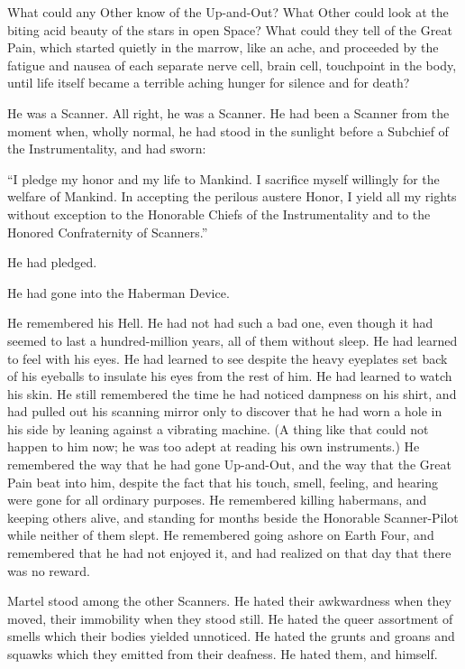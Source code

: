 What could any Other know of the Up-and-Out? What Other could look at the biting acid beauty of the stars in open Space? What could they tell of the Great Pain, which started quietly in the marrow, like an ache, and proceeded by the fatigue and nausea of each separate nerve cell, brain cell, touchpoint in the body, until life itself became a terrible aching hunger for silence and for death?

He was a Scanner. All right, he was a Scanner. He had been a Scanner from the moment when, wholly normal, he had stood in the sunlight before a Subchief of the Instrumentality, and had sworn:

``I pledge my honor and my life to Mankind. I sacrifice myself willingly for the welfare of Mankind. In accepting the perilous austere Honor, I yield all my rights without exception to the Honorable Chiefs of the Instrumentality and to the Honored Confraternity of Scanners.''

He had pledged.

He had gone into the Haberman Device.

He remembered his Hell. He had not had such a bad one, even though it had seemed to last a hundred-million years, all of them without sleep. He had learned to feel with his eyes. He had learned to see despite the heavy eyeplates set back of his eyeballs to insulate his eyes from the rest of him. He had learned to watch his skin. He still remembered the time he had noticed dampness on his shirt, and had pulled out his scanning mirror only to discover that he had worn a hole in his side by leaning against a vibrating machine. (A thing like that could not happen to him now; he was too adept at reading his own instruments.) He remembered the way that he had gone Up-and-Out, and the way that the Great Pain beat into him, despite the fact that his touch, smell, feeling, and hearing were gone for all ordinary purposes. He remembered killing habermans, and keeping others alive, and standing for months beside the Honorable Scanner-Pilot while neither of them slept. He remembered going ashore on Earth Four, and remembered that he had not enjoyed it, and had realized on that day that there was no reward.

Martel stood among the other Scanners. He hated their awkwardness when they moved, their immobility when they stood still. He hated the queer assortment of smells which their bodies yielded unnoticed. He hated the grunts and groans and squawks which they emitted from their deafness. He hated them, and himself.

